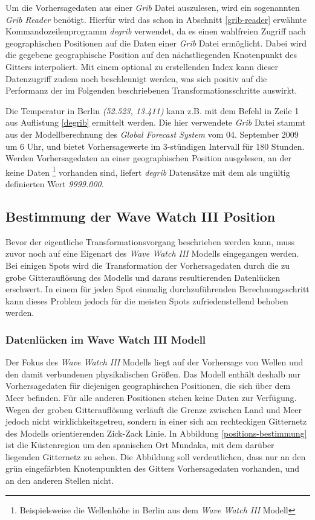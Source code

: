 Um die Vorhersagedaten aus einer \textit{Grib} Datei auszulesen, wird
ein sogenannten \textit{Grib Reader} benötigt. Hierfür wird das schon
in Abschnitt \ref{grib-reader} erwähnte Kommandozeilenprogramm
\textit{degrib} verwendet, da es einen wahlfreien Zugriff nach
geographischen Positionen auf die Daten einer \textit{Grib} Datei
ermöglicht. Dabei wird die gegebene geographische Position auf den
nächstliegenden Knotenpunkt des Gitters interpoliert. Mit einem
optional zu erstellenden Index kann dieser Datenzugriff zudem noch
beschleunigt werden, was sich positiv auf die Performanz der im
Folgenden beschriebenen Transformationsschritte auswirkt.



Die Temperatur in Berlin \textit{(52.523, 13.411)} kann z.B. mit dem
Befehl in Zeile 1 aus Auflistung \ref{degrib} ermittelt werden. Die
hier verwendete \textit{Grib} Datei stammt aus der Modellberechnung
des \textit{Global Forecast System} vom 04. September 2009 um 6 Uhr,
und bietet Vorhersagewerte im 3-stündigen Intervall für 180
Stunden. Werden Vorhersagedaten an einer geographischen Position
ausgelesen, an der keine Daten \footnote{Beispielsweise die Wellenhöhe
  in Berlin aus dem \textit{Wave Watch III} Modell} vorhanden sind,
liefert \textit{degrib} Datensätze mit dem als ungültig definierten
Wert \textit{9999.000}.

\subsection{Bestimmung der Wave Watch III Position}
Bevor der eigentliche Transformationsvorgang beschrieben werden kann,
muss zuvor noch auf eine Eigenart des \textit{Wave Watch III} Modells
eingegangen werden. Bei einigen Spots wird die Transformation der
Vorhersagedaten durch die zu grobe Gitterauflösung des Modells und
daraus resultierenden Datenlücken erschwert. In einem für jeden Spot
einmalig durchzuführenden Berechnungsschritt kann dieses Problem
jedoch für die meisten Spots zufriedenstellend behoben werden.

\subsubsection{Datenlücken im Wave Watch III Modell}
Der Fokus des \textit{Wave Watch III} Modells liegt auf der Vorhersage
von Wellen und den damit verbundenen physikalischen Größen. Das Modell
enthält deshalb nur Vorhersagedaten für diejenigen geographischen
Positionen, die sich über dem Meer befinden. Für alle anderen
Positionen stehen keine Daten zur Verfügung. Wegen der groben
Gitterauflösung verläuft die Grenze zwischen Land und Meer jedoch
nicht wirklichkeitsgetreu, sondern in einer sich am rechteckigen
Gitternetz des Modells orientierenden Zick-Zack Linie. In Abbildung
\ref{positions-bestimmung} ist die Küstenregion um den spanischen Ort
Mundaka, mit dem darüber liegenden Gitternetz zu sehen. Die Abbildung
soll verdeutlichen, dass nur an den grün eingefärbten Knotenpunkten
des Gitters Vorhersagedaten vorhanden, und an den anderen Stellen
nicht.

